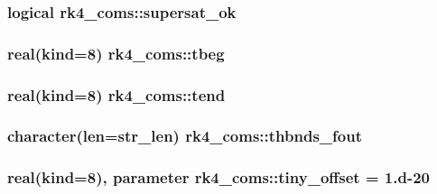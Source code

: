 \subsubsection[{supersat\+\_\+ok}]{\setlength{\rightskip}{0pt plus 5cm}logical rk4\+\_\+coms\+::supersat\+\_\+ok}\label{namespacerk4__coms_a304419c7dc18d710be779d2d1a1378e7}
\hypertarget{namespacerk4__coms_a9b09c4fc7f09c642c1115df229cedb1e}{}
\subsubsection[{tbeg}]{\setlength{\rightskip}{0pt plus 5cm}real(kind=8) rk4\+\_\+coms\+::tbeg}\label{namespacerk4__coms_a9b09c4fc7f09c642c1115df229cedb1e}
\hypertarget{namespacerk4__coms_a489d1f63edd639eb7a5c248163b59f9b}{}
\subsubsection[{tend}]{\setlength{\rightskip}{0pt plus 5cm}real(kind=8) rk4\+\_\+coms\+::tend}\label{namespacerk4__coms_a489d1f63edd639eb7a5c248163b59f9b}
\hypertarget{namespacerk4__coms_ab106d324ed571335ee763dd190e7430d}{}
\subsubsection[{thbnds\+\_\+fout}]{\setlength{\rightskip}{0pt plus 5cm}character(len=str\+\_\+len) rk4\+\_\+coms\+::thbnds\+\_\+fout}\label{namespacerk4__coms_ab106d324ed571335ee763dd190e7430d}
\hypertarget{namespacerk4__coms_a3d0ca14edbf0ca895d40d7a9c49e75da}{}
\subsubsection[{tiny\+\_\+offset}]{\setlength{\rightskip}{0pt plus 5cm}real(kind=8), parameter rk4\+\_\+coms\+::tiny\+\_\+offset = 1.d-\/20}\label{namespacerk4__coms_a3d0ca14edbf0ca895d40d7a9c49e75da}
\hypertarget{namespacerk4__coms_ac687fa7b7b3d3a5b1d3bd179e62c8052}{}

